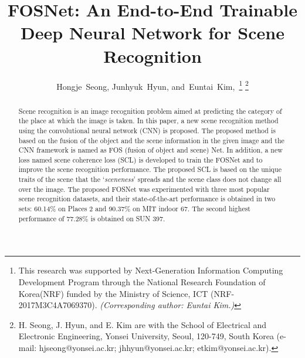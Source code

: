 \documentclass[journal,comsoc]{IEEEtran}
\begin{document}
\title{FOSNet: An End-to-End Trainable Deep Neural Network for Scene Recognition}


\author{Hongje~Seong,
        Junhyuk~Hyun,
        and~Euntai~Kim,~\thanks{This research was supported by Next-Generation Information Computing Development Program through the National Research Foundation of Korea(NRF) funded by the Ministry of Science, ICT (NRF-2017M3C4A7069370). \textit{(Corresponding author: Euntai Kim.)}}
\thanks{
H. Seong, J. Hyun, and E. Kim are with the School of Electrical and Electronic Engineering, Yonsei University, Seoul, 120-749, South Korea (e-mail: hjseong@yonsei.ac.kr; jhhyun@yonsei.ac.kr; etkim@yonsei.ac.kr).}}




















\maketitle

\begin{abstract}
Scene recognition is an image recognition problem aimed at predicting the category of the place at which the image is taken. In this paper, a new scene recognition method using the convolutional neural network (CNN) is proposed. The proposed method is based on the fusion of the object and the scene information in the given image and the CNN framework is named as FOS (fusion of object and scene) Net. In addition, a new loss named scene coherence loss (SCL) is developed to train the FOSNet and to improve the scene recognition performance. The proposed SCL is based on the unique traits of the scene that the `\textit{sceneness}' spreads and the scene class does not change all over the image. The proposed FOSNet was experimented with three most popular scene recognition datasets, and their state-of-the-art performance is obtained in two sets: 60.14\% on Places 2 and 90.37\% on MIT indoor 67. The second highest performance of 77.28\% is obtained on SUN 397.
\end{abstract}
\end{document}
